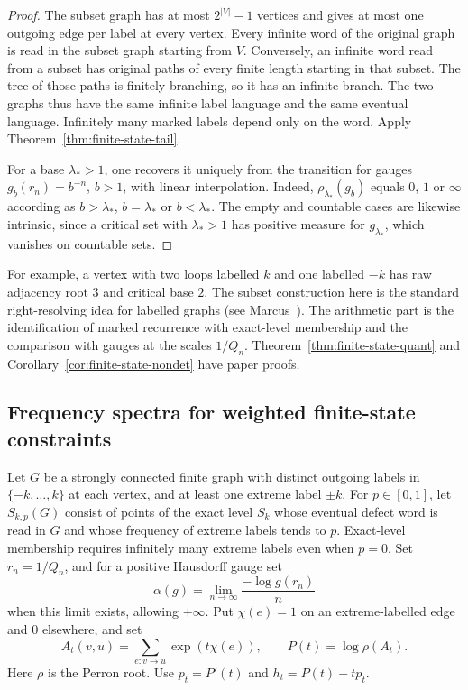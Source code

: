 \documentclass[11pt]{article}
\theoremstyle{definition}
\theoremstyle{remark}
\begin{document}
\begin{proof}
The subset graph has at most $2^{|V|}-1$ vertices and gives at most
one outgoing edge per label at every vertex. Every infinite word
of the original graph is read in the subset graph starting from
$V$. Conversely, an infinite word read from a subset has original
paths of every finite length starting in that subset. The tree of
those paths is finitely branching, so it has an infinite branch.
The two graphs thus have the same infinite label language and
the same eventual language. Infinitely many marked labels depend
only on the word. Apply Theorem~\ref{thm:finite-state-tail}.

For a base $\lambda_*>1$, one recovers it uniquely from the
transition for gauges $g_b(r_n)=b^{-n}$, $b>1$, with linear
interpolation. Indeed, $\rho_{\lambda_*}(g_b)$ equals $0$, $1$
or $\infty$ according as $b>\lambda_*$, $b=\lambda_*$ or
$b<\lambda_*$. The empty and countable cases are likewise
intrinsic, since a critical set with $\lambda_*>1$ has positive
measure for $g_{\lambda_*}$, which vanishes on countable sets.
\end{proof}

For example, a vertex with two loops labelled $k$ and one labelled
$-k$ has raw adjacency root $3$ and critical base $2$. The subset
construction here is the standard right-resolving idea for labelled
graphs (see Marcus~\cite[\S II-F]{MarcusSofic}). The arithmetic
part is the identification of marked recurrence with exact-level
membership and the comparison with gauges at the scales $1/Q_n$.
Theorem~\ref{thm:finite-state-quant} and
Corollary~\ref{cor:finite-state-nondet} have paper proofs.

\subsection{Frequency spectra for weighted finite-state constraints}
Let $G$ be a strongly connected finite graph with distinct outgoing
labels in $\{-k,\ldots,k\}$ at each vertex, and at least one extreme
label $\pm k$. For $p\in[0,1]$, let $S_{k,p}(G)$ consist of points of
the exact level $S_k$ whose eventual defect word is read in $G$ and
whose frequency of extreme labels tends to $p$. Exact-level membership
requires infinitely many extreme labels even when $p=0$.
Set $r_n=1/Q_n$, and for a positive Hausdorff gauge set
\[
 \alpha(g)=\lim_{n\to\infty}\frac{-\log g(r_n)}{n}
\]
when this limit exists, allowing $+\infty$.
Put $\chi(e)=1$ on an extreme-labelled edge and $0$ elsewhere, and set
\[
 A_t(v,u)=\sum_{e:v\to u}\exp(t\chi(e)),\qquad
 P(t)=\log\rho(A_t).
\]
Here $\rho$ is the Perron root. Use $p_t=P'(t)$ and
$h_t=P(t)-tp_t$.
\end{document}
